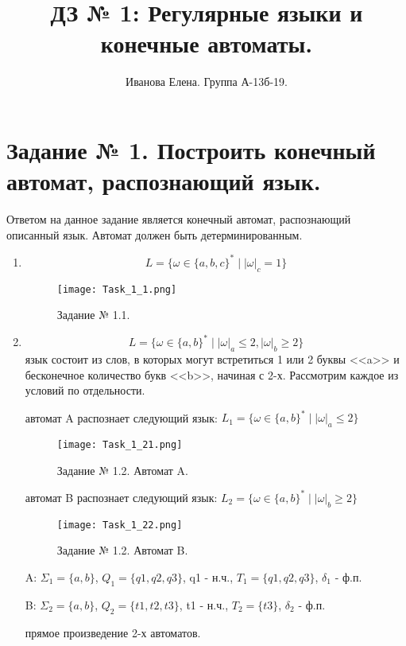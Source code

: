\documentclass[a4paper, 12pt]{article}
\title{ДЗ № 1: Регулярные языки и конечные автоматы.}
\author{Иванова Елена. Группа А-13б-19.}
\date{}
\begin{document}
\maketitle

\newpage

\section{Задание № 1.  Построить конечный автомат, распознающий язык.}

Ответом на данное задание является конечный автомат, распознающий описанный язык. Автомат должен быть детерминированным.

\begin{enumerate}

\item$$ L = \{\omega \in \{a, b, c\}^* \mid  |\omega|_c = 1 \} $$
\begin{figure}[!h]
\centering
\texttt{[image: Task\_1\_1.png]}
\caption{Задание № 1.1.}
\end{figure}

\item$$ L = \{\omega \in \{a, b\}^* \mid |\omega|_a \leq 2,|\omega|_b \geq 2 \} $$
 язык состоит из слов, в которых могут встретиться 1 или 2 буквы <<a>> и бесконечное количество букв <<b>>, начиная с 2-х. Рассмотрим каждое из условий по отдельности.

 автомат A распознает следующий язык: $ L_1 = \{\omega \in \{a, b\}^* \mid |\omega|_a \leq 2 \} $
\begin{figure}[h!]
\centering
\texttt{[image: Task\_1\_21.png]}
\caption{Задание № 1.2. Автомат A.}
\end{figure}

 автомат B распознает следующий язык: $ L_2 = \{\omega \in \{a, b\}^* \mid |\omega|_b \geq 2 \} $
\begin{figure}[!h]
\centering
\texttt{[image: Task\_1\_22.png]}
\caption{Задание № 1.2. Автомат B.}
\end{figure}

 A: $ \Sigma_1 = \{a, b\}$, $ Q_1 = \{q1, q2, q3 \} $, q1 - н.ч., $ T_1 = \{q1, q2, q3 \} $, $ \delta_1 $ - ф.п.

 B: $ \Sigma_2 = \{a, b\}$, $ Q_2 = \{t1, t2, t3 \} $, t1 - н.ч., $ T_2 = \{t3 \} $, $ \delta_2 $ - ф.п.

 прямое произведение 2-х автоматов.


\end{enumerate}
\end{document}
